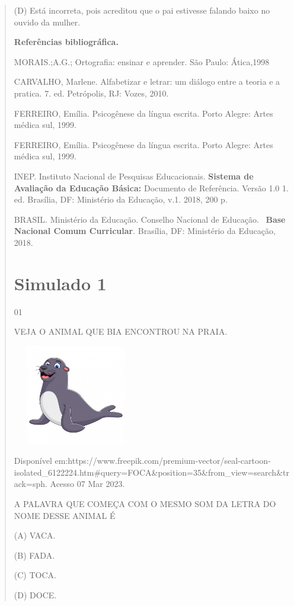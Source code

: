 {{{{\begin{verse}
{{\begin{escolha}
{{{{{(D) Está incorreta, pois acreditou que o pai estivesse falando baixo no
ouvido da mulher.

\textbf{Referências bibliográfica.}

MORAIS.;A.G.; Ortografia: ensinar e aprender. São Paulo: Ática,1998

CARVALHO, Marlene. Alfabetizar e letrar: um diálogo entre a teoria e a
pratica. 7. ed. Petrópolis, RJ: Vozes, 2010.

FERREIRO, Emília. Psicogênese da língua escrita. Porto Alegre: Artes
médica sul, 1999.

FERREIRO, Emília. Psicogênese da língua escrita. Porto Alegre: Artes
médica sul, 1999.

INEP. Instituto Nacional de Pesquisas Educacionais. \textbf{Sistema de
Avaliação da Educação Básica:} Documento de Referência. Versão 1.0 1.
ed. Brasília, DF: Ministério da Educação, v.1. 2018, 200 p.

BRASIL. Ministério da Educação. Conselho Nacional de Educação.~
\textbf{Base Nacional Comum Curricular}. Brasília, DF: Ministério da
Educação, 2018.

\chapter{Simulado 1}

\num{01}

VEJA O ANIMAL QUE BIA ENCONTROU NA PRAIA.

\includegraphics[width=2.16528in,height=1.72778in]{media/image139.jpeg}

Disponível
em:https://www.freepik.com/premium-vector/seal-cartoon-isolated\_6122224.htm\#query=FOCA\&position=35\&from\_view=search\&track=sph.
Acesso 07 Mar 2023.

A PALAVRA QUE COMEÇA COM O MESMO SOM DA LETRA DO NOME DESSE ANIMAL É

(A) VACA.

(B) FADA.

(C) TOCA.

(D) DOCE.

}}}}}
\end{escolha}}}
\end{verse}}}}}
